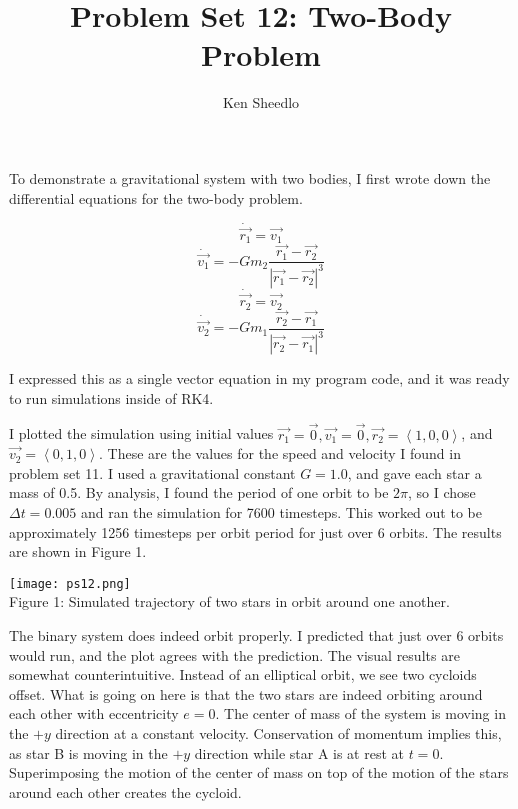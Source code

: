 \documentclass[12pt, letterpaper]{article}
\title{Problem Set 12: Two-Body Problem}
\author{Ken Sheedlo}
\begin{document}
\maketitle{}

To demonstrate a gravitational system with two bodies, I first wrote down the
differential equations for the two-body problem.

\begin{equation}
\dot{\vec{r_1}} = \vec{v_1}
\end{equation}
\begin{equation}
\dot{\vec{v_1}} = -Gm_2\frac{\vec{r_1}-\vec{r_2}}{|\vec{r_1}-\vec{r_2}|^3}
\end{equation}
\begin{equation}
\dot{\vec{r_2}} = \vec{v_2}
\end{equation}
\begin{equation}
\dot{\vec{v_2}} = -Gm_1\frac{\vec{r_2}-\vec{r_1}}{|\vec{r_2}-\vec{r_1}|^3}
\end{equation}

I expressed this as a single vector equation in my program code, and it was 
ready to run simulations inside of RK4. 

I plotted the simulation using initial values $\vec{r_1} = \vec{0}, \vec{v_1} = 
\vec{0}, \vec{r_2} = \left<1, 0, 0\right>$, and $\vec{v_2} = \left<0, 1, 
0\right>$. These are the values for the speed and velocity I found in problem set 
11. I used a gravitational constant $G=1.0$, and gave each star a mass of 0.5. 
By analysis, I found the period of one orbit to be $2\pi$, so I chose $\Delta t
=0.005$ and ran the simulation for 7600 timesteps. This worked out to be 
approximately 1256 timesteps per orbit period for just over 6 orbits. The results 
are shown in Figure 1.

\newpage

\begin{center}
\texttt{[image: ps12.png]}
\\
Figure 1: Simulated trajectory of two stars in orbit around one another.
\end{center}

The binary system does indeed orbit properly. I predicted that just over 6 orbits
would run, and the plot agrees with the prediction. The visual results are 
somewhat counterintuitive. Instead of an elliptical orbit, we see two cycloids 
offset. What is going on here is that the two stars are indeed orbiting around 
each other with eccentricity $e=0$. The center of mass of the system is moving in 
the $+y$ direction at a constant velocity. Conservation of momentum implies this, 
as star B is moving in the $+y$ direction while star A is at rest at $t=0$. 
Superimposing the motion of the center of mass on top of the motion of the stars 
around each other creates the cycloid. 
\end{document}
